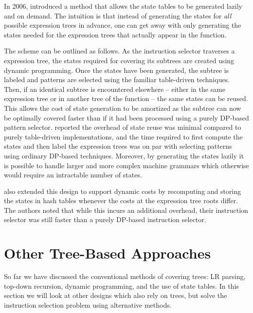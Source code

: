 In 2006, \textcite{ErtlEtAl:2006} introduced a method that allows the
\gls{state} tables to be generated lazily and on demand.
%
The intuition is that instead of generating the \glspl{state} for \emph{all}
possible \glspl{expression tree} in advance, one can get away with only
generating the \glspl{state} needed for the \glspl{expression tree} that
actually appear in the \gls{function}.

The scheme can be outlined as follows.
%
As the \gls{instruction selector} traverses a \gls{expression tree}, the
\glspl{state} required for covering its \glspl{subtree} are created using
dynamic programming.
%
Once the \glspl{state} have been generated, the \gls{subtree} is labeled and
\glspl{pattern} are selected using the familiar table-driven techniques.
%
Then, if an identical \gls{subtree} is encountered elsewhere -- either in the
same \gls{expression tree} or in another \gls{tree} of the \gls{function} -- the
same \glspl{state} can be reused.
%
This allows the cost of \gls{state} generation to be amortized as the
\gls{subtree} can now be optimally covered faster than if it had been processed
using a purely \gls{DP}-based \gls{pattern selector}.
%
\citeauthor{ErtlEtAl:2006} reported the overhead of \gls{state} reuse was
minimal compared to purely table-driven implementations, and the time required
to first compute the \glspl{state} and then label the \glspl{expression tree}
was on par with selecting \glspl{pattern} using ordinary \gls{DP}-based
techniques.
%
Moreover, by generating the \glspl{state} lazily it is possible to handle larger
and more complex \glspl{machine grammar} which otherwise would require an
intractable number of \glspl{state}.

\citeauthor{ErtlEtAl:2006} also extended this design to support dynamic costs by
recomputing and storing the \glspl{state} in hash tables whenever the costs at
the \gls{expression tree} \glspl{root} differ.
%
The authors noted that while this incurs an additional overhead, their
\gls{instruction selector} was still faster than a purely \gls{DP}-based
\gls{instruction selector}.


\section{Other Tree-Based Approaches}

So far we have discussed the conventional methods of covering \glspl{tree}:
\gls{LR parsing}, top-down recursion, dynamic programming, and the use of
\gls{state} tables.
%
In this section we will look at other designs which also rely on \glspl{tree},
but solve the \gls{instruction selection} problem using alternative methods.


